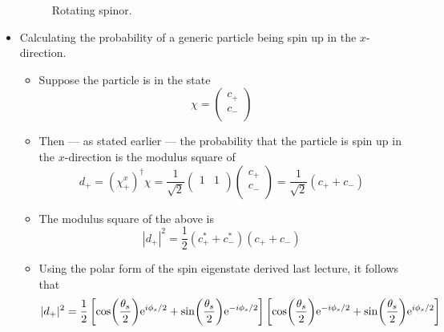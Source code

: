 \documentclass[../notes.tex]{subfiles}
\begin{document}
\begin{itemize}
\begin{figure}[H]
        \caption{Rotating spinor.}
        \label{fig:rotatingSpinor}
    \end{figure}
    \item Calculating the probability of a generic particle being spin up in the $x$-direction.
    \begin{itemize}
        \item Suppose the particle is in the state
        \begin{equation*}
            \chi =
            \begin{pmatrix}
                c_+\\
                c_-\\
            \end{pmatrix}
        \end{equation*}
        \item Then --- as stated earlier --- the probability that the particle is spin up in the $x$-direction is the modulus square of
        \begin{equation*}
            d_+ = (\chi_+^x)^\dagger\chi = \frac{1}{\sqrt{2}}
            \begin{pmatrix}
                1 & 1\\
            \end{pmatrix}
            \begin{pmatrix}
                c_+\\
                c_-\\
            \end{pmatrix}
            = \frac{1}{\sqrt{2}}(c_++c_-)
        \end{equation*}
        \item The modulus square of the above is
        \begin{equation*}
            |d_+|^2 = \frac{1}{2}(c_+^*+c_-^*)(c_++c_-)
        \end{equation*}
        \item Using the polar form of the spin eigenstate derived last lecture, it follows that
        \begin{align*}
            |d_+|^2 &= \frac{1}{2}\left[ \cos(\frac{\theta_s}{2})\e[i\phi_s/2]+\sin(\frac{\theta_s}{2})\e[-i\phi_s/2] \right]\left[ \cos(\frac{\theta_s}{2})\e[-i\phi_s/2]+\sin(\frac{\theta_s}{2})\e[i\phi_s/2] \right]\\

\end{align*}
\end{itemize}
\end{itemize}
\end{document}
